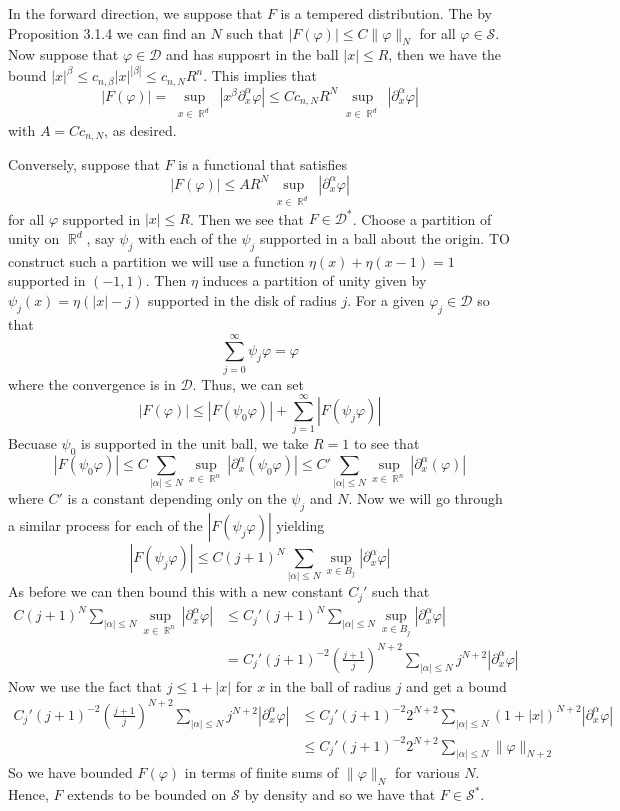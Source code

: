 \documentclass{article}
\DeclareMathOperator{\R}{\mathbb{R}}
\newcommand{\exercise}[1]{\noindent{\textbf{Exercise #1:}}}
\newcommand{\norm}[1]{\|#1\|}
\begin{document}
\exercise{3.4.7} In the forward direction, we suppose that $F$ is a
tempered distribution. The by Proposition 3.1.4 we can find an $N$
such that $|F(\varphi)| \leq C\norm{\varphi}_N$ for all $\varphi \in
\mathcal{S}$. Now suppose that $\varphi \in \mathcal{D}$ and has
supposrt in the ball $|x| \leq R$, then we have the bound $|x|^\beta \leq
c_{n,\beta}|x|^{|\beta|} \leq c_{n,N}R^n$. This implies that
\[
|F(\varphi)| = \sup_{\substack{x\in\R^d}}
|x^{\beta}\partial_{x}^{\alpha}\varphi| \leq
Cc_{n,N}R^N\sup_{\substack{x\in\R^d}} |\partial_x^\alpha\varphi|
\]
with $A = Cc_{n,N}$, as desired.

Conversely, suppose that $F$ is a functional that satisfies
\[
|F(\varphi)| \leq
AR^N\sup_{\substack{x\in\R^d}}|\partial_x^\alpha\varphi|
\]
for all $\varphi$ supported in $|x| \leq R$. Then we see that $F \in
\mathcal{D}^\ast$. Choose a partition of unity on $\R^d$, say $\psi_j$
with each of the $\psi_j$ supported in a ball about the origin. TO
construct such a partition we will use a function $\eta(x) + \eta(x-1)
= 1$ supported in $(-1,1)$. Then $\eta$ induces a partition of unity
given by $\psi_j(x) = \eta(|x| - j)$ supported in the disk of radius
$j$. For a given $\varphi_j \in \mathcal{D}$ so that
\[
\sum_{j=0}^\infty \psi_j\varphi = \varphi
\]
where the convergence is in $\mathcal{D}$. Thus, we can set
\[
|F(\varphi)| \leq |F(\psi_0\varphi)| + \sum_{j=1}^\infty
|F(\psi_j\varphi)|
\]
Becuase $\psi_0$ is supported in the unit ball, we take $R = 1$ to see
that
\[
|F(\psi_0\varphi)| \leq C\sum_{|\alpha|\leq N}
\sup_{x\in\R^n}|\partial^\alpha_x(\psi_0\varphi)| \leq
C'\sum_{|\alpha|\leq N}
\sup_{x\in\R^n}|\partial^\alpha_x(\varphi)|
\]
where $C'$ is a constant depending only on the $\psi_j$ and $N$. Now
we will go through a similar process for each of the
$|F(\psi_j\varphi)|$ yielding
\[
|F(\psi_j\varphi)| \leq C(j+1)^N \sum_{|\alpha|\leq N} \sup_{x \in
  B_j}|\partial_x^\alpha\varphi|
\]
As before we can then bound this with a new constant $C_j'$ such that
\begin{align*}
  C(j+1)^N \sum_{|\alpha|\leq N} \sup_{x \in
    \R^n}|\partial_x^\alpha\varphi| &\leq C_j'(j+1)^N
  \sum_{|\alpha|\leq N} \sup_{x \in B_j}|\partial_x^\alpha\varphi| \\
  &= C_j'(j+1)^{-2}\left(\frac{j+1}{j}\right)^{N+2} \sum_{|\alpha|
    \leq N} j^{N+2}|\partial_x^\alpha\varphi|
\end{align*}
Now we use the fact that $j \leq 1+|x|$ for $x$ in the ball of radius
$j$ and get a bound
\begin{align*}
  C_j'(j+1)^{-2}\left(\frac{j+1}{j}\right)^{N+2}\sum_{|\alpha| \leq N}
  j^{N+2}|\partial_x^\alpha\varphi| &\leq
  C_j'(j+1)^{-2}2^{N+2}\sum_{|\alpha| \leq N}
  (1+|x|)^{N+2}|\partial_x^\alpha\varphi| \\
  &\leq C_j'(j+1)^{-2}2^{N+2}\sum_{|\alpha| \leq N} \norm{\varphi}_{N+2}
\end{align*}
So we have bounded $F(\varphi)$ in terms of finite sums of
$\norm{\varphi}_N$ for various $N$. Hence, $F$ extends to be bounded on
$\mathcal{S}$ by density and so we have that $F \in \mathcal{S}^\ast$.
\end{document}
